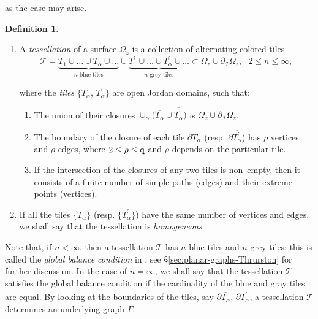 \documentclass[final,3p,times]{elsarticle}
\theoremstyle{definition}
\newtheorem{definition}[theorem]{Definition}
\begin{document}
\noindent
as the case may arise.

\begin{definition}
\label{def:de-teselacion}
\
\begin{enumerate}[label=\arabic*),leftmargin=*] 
\item
A  \emph{tessellation} of a
surface $\Omega_z$ is a collection 
of alternating colored tiles
\begin{equation}
\label{teselacion}
\mathscr{T}
=
\underbrace{
T_1 \cup \ldots \cup T_\alpha \cup \ldots  }_{ n\text{ blue tiles} }
\cup 
\underbrace{ T^\prime_1 \cup  
\ldots  \cup T^{\prime}_\alpha  \cup \ldots }_{n \text{ grey tiles}} \subset 
\Omega_z \cup \partial_{\mathcal{I}} \Omega_z, 
\ \ \ 
2 \leq n \leq \infty,
\end{equation}

\noindent
where the \emph{tiles}
$\{ T_{\alpha}, \, T_{\alpha}^\prime \}$
are open Jordan domains, 
such that: 

\begin{enumerate}[label=\roman*),leftmargin=*]
\item
The union of their closures 
$\cup_{{\alpha}}
\big( \overline{T_{\alpha}} 
\cup
\overline{T_{\alpha}^\prime } \big)$
is $\Omega_z \cup \partial_{\mathcal{I}} \Omega_z$.

\item 
The boundary of the closure of each tile 
$\partial\overline{T_\alpha}$ (resp. 
$\partial\overline{ T_{\alpha}^\prime}$) has 
$\rho$ vertices and $\rho$ edges, where $2 \leq \rho \leq {\tt q}$
and $\rho$ depends on the particular tile. 
 


\item
If the intersection of the closures of any
two tiles is non--empty, 
then it consists of a finite number of 
simple paths (edges) and their extreme points (vertices).
\end{enumerate}

\item
If all the tiles $\{ T_{\alpha} \}$
(resp. $\{T_{\alpha}^\prime \}$) have 
the same number of vertices and edges,
we shall say that the tessellation is \emph{homogeneous}.
\end{enumerate}
\end{definition}


Note that, if $n<\infty$, then 
a  tessellation $\mathscr{T}$
has $n$ blue tiles and $n$ grey tiles; this is 
called the {\it global balance condition} in
\cite{Koch-Lei}, see \S \ref{sec:planar-graphs-Thrurston} for
further discussion. 
In the case of $n=\infty$, we shall say that the tessellation $\mathscr{T}$ satisfies
the global balance condition if the cardinality of the blue
and gray tiles are equal.
By looking at the boundaries of the tiles,
say $\partial \overline{T_\alpha}, \,  
\partial \overline{T_{\alpha}^\prime}$,
a tessellation $\mathscr{T}$ 
determines an underlying graph $\Gamma$.
\end{document}
